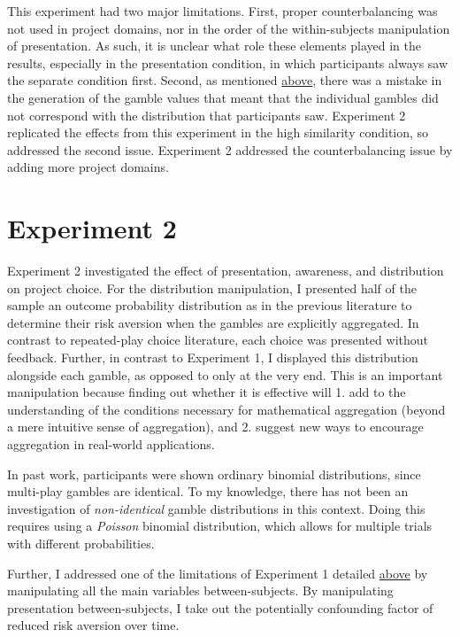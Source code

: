 \documentclass[a4paper, nobind, dvipsnames]{templates/ociamthesis}
\theoremstyle{definition}
\theoremstyle{definition}
\theoremstyle{definition}
\theoremstyle{definition}
\theoremstyle{remark}
\begin{document}
This experiment had two major limitations. First, proper counterbalancing was
not used in project domains, nor in the order of the within-subjects
manipulation of presentation. As such, it is unclear what role these elements
played in the results, especially in the presentation condition, in which
participants always saw the separate condition first. Second, as mentioned
\protect\hyperlink{outcome-distribution-materials-aggregation-1}{above}, there was a mistake in the
generation of the gamble values that meant that the individual gambles did not
correspond with the distribution that participants saw. Experiment 2 replicated
the effects from this experiment in the high similarity condition, so addressed
the second issue. Experiment 2 addressed the counterbalancing issue by adding
more project domains.

\section{Experiment 2}

Experiment 2 investigated the effect of presentation, awareness, and
distribution on project choice. For the distribution manipulation, I presented
half of the sample an outcome probability distribution as in the previous
literature \autocites[e.g.,][]{redelmeier1992,webb2017} to determine their risk aversion
when the gambles are explicitly aggregated. In contrast to repeated-play choice
literature, each choice was presented without feedback. Further, in contrast to
Experiment 1, I displayed this distribution alongside each gamble, as opposed to
only at the very end. This is an important manipulation because finding out
whether it is effective will 1. add to the understanding of the conditions
necessary for mathematical aggregation (beyond a mere intuitive sense of
aggregation), and 2. suggest new ways to encourage aggregation in real-world
applications.

In past work, participants were shown ordinary binomial distributions, since
multi-play gambles are identical. To my knowledge, there has not been an
investigation of \emph{non-identical} gamble distributions in this context. Doing
this requires using a \emph{Poisson} binomial distribution, which allows for multiple
trials with different probabilities.

Further, I addressed one of the limitations of Experiment 1 detailed
\protect\hyperlink{discussion-aggregation-1}{above} by manipulating all the main variables
between-subjects. By manipulating presentation between-subjects, I take out the
potentially confounding factor of reduced risk aversion over time.
\end{document}
